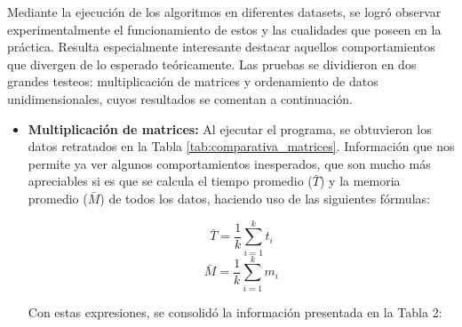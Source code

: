 
Mediante la ejecución de los algoritmos en diferentes datasets, se logró observar experimentalmente el funcionamiento de estos y las cualidades que poseen en la práctica. Resulta especialmente interesante destacar aquellos comportamientos que divergen de lo esperado teóricamente. Las pruebas se dividieron en dos grandes testeos: multiplicación de matrices y ordenamiento de datos unidimensionales, cuyos resultados se comentan a continuación.

\begin{itemize}
    \item \textbf{Multiplicación de matrices:}
    Al ejecutar el programa, se obtuvieron los datos retratados en la Tabla \ref{tab:comparativa_matrices}. Información que nos permite ya ver algunos comportamientos inesperados, que son mucho más apreciables si es que se calcula el tiempo promedio ($\bar{T}$) y la memoria promedio ($\bar{M}$) de todos los datos, haciendo uso de las siguientes fórmulas:

    \[ \bar{T} = \frac{1}{k} \sum_{i=1}^{k} t_i \]
    \[ \bar{M} = \frac{1}{k} \sum_{i=1}^{k} m_i \]

    Con estas expresiones, se consolidó la información presentada en la Tabla 2:

    \begin{table}[H]
    \centering
    \caption{Comparativa de resultados: Datos brutos vs. Promedios}
    \label{tab:comparativa_matrices}
    

\end{table}
\end{itemize}
